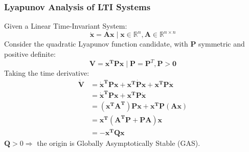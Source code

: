 \documentclass[11pt,handout]{beamer}   %
\begin{document}
\begin{frame}
\frametitle{Lyapunov Analysis of LTI Systems}
\small
Given a Linear Time-Invariant System:
\begin{equation*}
\mathbf{\dot{x} = Ax} \; | \; \mathbf{x}\in\mathbb{R}^n , \mathbf{A}\in\mathbb{R}^{n\times n}
\end{equation*}
Consider the quadratic Lyapunov function candidate, with $\mathbf{P}$ symmetric and positive definite:
\begin{equation*}
\mathbf{V = x^T P x} \; | \; \mathbf{P} = \mathbf{P}^T , \mathbf{P>0}
\end{equation*}
Taking the time derivative:
\begin{equation*}
\begin{aligned}
\mathbf{\dot{V}} &= \mathbf{\dot{x}^T P x + x^T\dot{P}x + x^T P\dot{x}}\\
&= \mathbf{\dot{x}^T P x + x^T P\dot{x}}\\
&= \mathbf{(x^T A^T) P x + x^T P (A x)}\\
&= \mathbf{x^T (A^T P +  P A) x}\\
&= -\mathbf{x^T Q x}
\end{aligned}
\end{equation*}
$\mathbf{Q} >0 \Rightarrow$  the origin is Globally Asymptotically Stable (GAS).
\end{frame}
\end{document}
